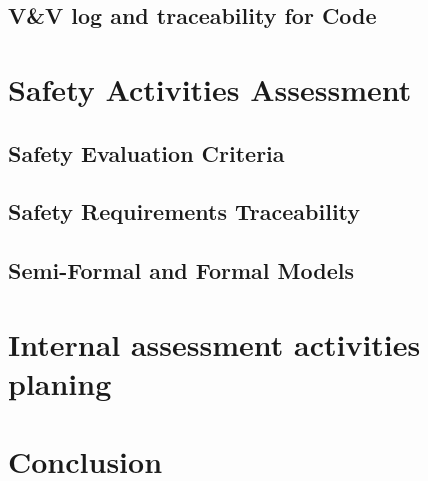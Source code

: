 \documentclass{template/openetcs_report}
\begin{document}
\section{V\&V log and traceability for Code}



\chapter{Safety Activities Assessment}

\section{Safety Evaluation Criteria}

\section{Safety Requirements Traceability}

\section{Semi-Formal and Formal Models}


\chapter{Internal assessment activities planing}

\chapter{Conclusion}




\end{document}
